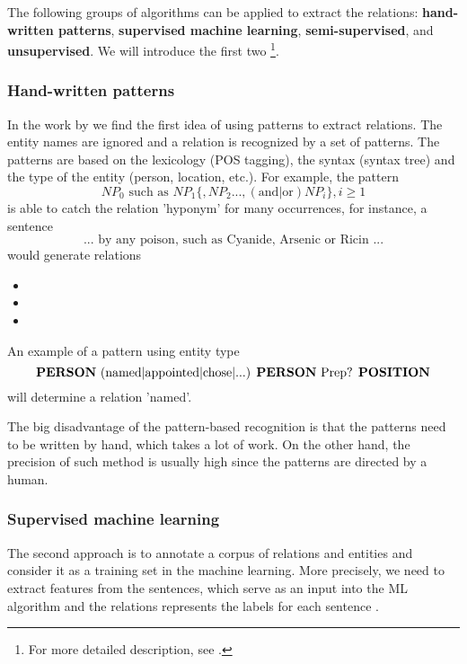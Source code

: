 \documentclass[
  digital, %
  table,   %
  lof,     %
  lot,     %
]{fithesis3}
\begin{document}
The following groups of algorithms can be applied to extract the relations: \textbf{hand-written patterns}, \textbf{supervised machine learning}, \textbf{semi-supervised}, and \textbf{unsupervised}.
We will introduce the first two
\footnote{For more detailed description, see  \cite{jurafsky2014speech}.}.

\subsubsection{\textbf{Hand-written patterns}}
In the work  by \citeauthor{hearst1992automatic} \cite{hearst1992automatic} we find the first idea of using patterns to extract relations.
The entity names are ignored and a relation is recognized by a set of patterns.
The patterns are based on the lexicology (POS tagging), the syntax (syntax tree) and the type of the entity (person, location, etc.).
For example, the pattern \cite[sec. 21.2]{jurafsky2014speech}
$$
NP_0\text{ such as }NP_1 \{, NP_2 ..., (\text{and|or})NP_i \}, i \geq 1
$$
is able to catch the relation 'hyponym' for many occurrences, for instance, a sentence
$$
\text{... by any poison, such as Cyanide, Arsenic or Ricin ...}
$$
would generate relations 
\begin{itemize}
\item <poison, hyponym of, Cyanide>
\item <poison, hyponym of, Arsenic>
\item <poison, hyponym of, Ricin>
\end{itemize}
An example of a pattern using entity type \cite[sec. 21.2]{jurafsky2014speech}
$$
\text{\textbf{PERSON} (named|appointed|chose|...) \textbf{PERSON} Prep? \textbf{POSITION}}
$$
will determine a relation 'named'. 

The big disadvantage of the pattern-based recognition is that the patterns need to be written by hand, which takes a lot of work. On the other hand, the precision of such method is usually high since the patterns are directed by a human.

\subsubsection{\textbf{Supervised machine learning}}
The second approach is to annotate a corpus of relations and entities and consider it as a training set in the machine learning.
More precisely, we need to extract features from the sentences, which serve as an input into the ML algorithm and the relations represents the labels for each sentence
\cite[sec 21.2]{jurafsky2014speech}.
\end{document}
